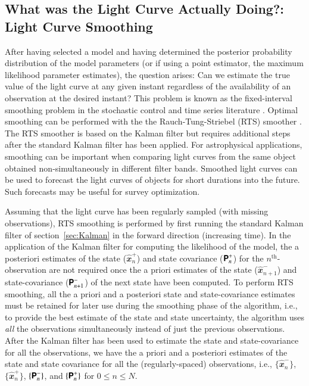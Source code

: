 \documentclass[a4paper,fleqn,usenatbib]{mnras}
\begin{document}
\subsection[Light Curve Smoothing]{What was the Light Curve Actually Doing?: Light Curve Smoothing}\label{sec:Smoothing}

After having selected a model and having determined the posterior probability distribution of the model parameters (or if using a point estimator, the maximum likelihood parameter estimates), the question arises: Can we estimate the true value of the light curve at any given instant regardless of the availability of an observation at the desired instant? This problem is known as the fixed-interval smoothing problem in the stochastic control and time series literature \citep{Simon,DurbinKoopman}. Optimal smoothing can be performed with the the Rauch-Tung-Striebel (RTS) smoother \citep*{RTS65}. The RTS smoother is based on the Kalman filter but requires additional steps after the standard Kalman filter has been applied. For astrophysical applications, smoothing can be important when comparing light curves from the same object obtained non-simultaneously in different filter bands. Smoothed light curves can be used to forecast the light curves of objects for short durations into the future. Such forecasts may be useful for survey optimization. 

Assuming that the light curve has been regularly sampled (with missing observations), RTS smoothing is performed by first running the standard Kalman filter of section~\ref{sec:Kalman} in the forward direction (increasing time). In the application of the Kalman filter for computing the likelihood of the model, the a posteriori estimates of the state ($\widehat{\mathbfit{x}}^{+}_{n}$) and state covariance ($\textbf{\textsf{P}}^{+}_{n}$) for the $n^{\mathrm{th}}$-observation are not required once the a priori estimates of the state ($\widehat{\mathbfit{x}}^{-}_{n+1}$) and state-covariance ($\textbf{\textsf{P}}^{-}_{n+1}$) of the next state have been computed. To perform RTS smoothing, all the a priori and a posteriori state and state-covariance estimates must be retained for later use during the smoothing phase of the algorithm, i.e., to provide the best estimate of the state and state uncertainty, the algorithm uses \textit{all} the observations simultaneously instead of just the previous observations.
After the Kalman filter has been used to estimate the state and state-covariance for all the observations, we have the a priori and a posteriori estimates of the state and state covariance for all the (regularly-spaced) observations, i.e., $\{ \widehat{\mathbfit{x}}^{-}_{n} \}$, $\{ \widehat{\mathbfit{x}}^{+}_{n} \}$, $\{ \textbf{\textsf{P}}^{-}_{n} \}$, and $\{ \textbf{\textsf{P}}^{+}_{n} \}$ for $0 \leq n \leq N$. 
\end{document}
